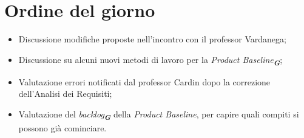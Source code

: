 

\section{Ordine del giorno}

\begin{itemize}
    \item Discussione modifiche proposte nell'incontro con il professor Vardanega;
    \item Discussione su alcuni nuovi metodi di lavoro per la \emph{Product Baseline}\textsubscript{\textit{\textbf{G}}};
    \item Valutazione errori notificati dal professor Cardin dopo la correzione dell'Analisi dei Requisiti;
    \item Valutazione del \emph{backlog}\textsubscript{\textit{\textbf{G}}} della \emph{Product Baseline}, per capire
    quali compiti si possono già cominciare.
    
\end{itemize}